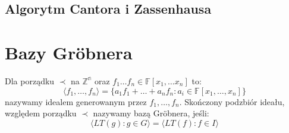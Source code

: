 \documentclass{../notatki}
\begin{document}
\subsection{Algorytm Cantora i Zassenhausa}

\section{Bazy Gröbnera}

Dla porządku $\prec$ na $\mathbb{Z^n}$ oraz $f_1 \dots f_n \in
\mathbb{F}[x_1, \dots x_n]$ to:
$$
\langle f_1, \dots, f_n \rangle = \{a_1f_1 + \dots + a_nf_n : a_i \in
\mathbb{F}[x_1, \dots, x_n]\}
$$
nazywamy idealem generowanym przez $f_1, \dots, f_n$. Skończony podzbiór ideału,
względem porządku $\prec$ nazywamy bazą Gröbnera, jeśli:
$$
\langle LT(g) : g \in G \rangle = \langle LT(f) : f \in I \rangle
$$
\end{document}
